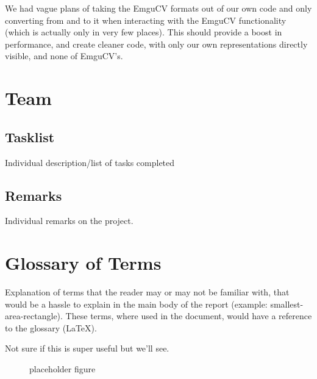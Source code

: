 \documentclass[10pt,twocolumn]{article}
\begin{document}
We had vague plans of taking the EmguCV formats out of our own code and only converting from and to it when interacting with the EmguCV functionality (which is actually only in very few places). This should provide a boost in performance, and create cleaner code, with only our own representations directly visible, and none of EmguCV's.

\section{Team}

\subsection{Tasklist}
Individual description/list of tasks completed 

\subsection{Remarks}
Individual remarks on the project.

\section{Glossary of Terms}
Explanation of terms that the reader may or may not be familiar with, that would be a hassle to explain in the main body of the report (example: smallest-area-rectangle). These terms, where used in the document, would have a reference to the glossary (LaTeX).

Not sure if this is super useful but we'll see.

\begin{figure}[!b]
	  \begin{center}
	  \end{center}

  \caption{\small placeholder figure}
  \label{azahar2}
\end{figure}



\end{document}
